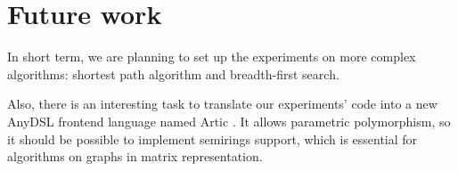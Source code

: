 \documentclass[conference]{IEEEtran}
\begin{document}
\section{Future work}

In short term, we are planning to set up the experiments on more complex algorithms: shortest path algorithm and breadth-first search.

Also, there is an interesting task to translate our experiments' code into a new AnyDSL frontend language named Artic \cite{articgit}. It allows parametric polymorphism, so it should be possible to implement semirings support, which is essential for algorithms on graphs in matrix representation.




\end{document}

